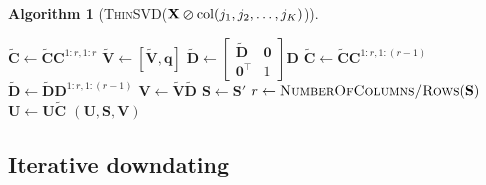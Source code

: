 \documentclass[11pt,a4paper]{article}
\theoremstyle{break}
\newtheorem*{algorithm}{Algorithm}
\numberwithin{dummy}{section}
\theoremstyle{plain}
\theoremstyle{plain}
\theoremstyle{plain}
\theoremstyle{plain}
\theoremstyle{plain}
\theoremstyle{MyNonumberplain}
\newcommand{\0}{\M{0}}
\newcommand{\M}[1]{\mathbf{#1}}
\newcommand{\Mt}[1]{\tilde{\M{#1}}}
\newcommand{\T}{\top}
\newcommand{\ve}[1]{\mathbf{#1}}
\newcommand{\delrow}[2]{\M{#1} \varominus \mathrm{row}(#2)}
\newcommand{\zercol}[2]{\M{#1} \varoslash \mathrm{col}(#2)}
\begin{document}
\begin{algorithm}[\textnormal{\textsc{ThinSVD}(\unboldmath$\zercol{X}{j_1,j_2, \dots, j_K}$)}]
\begin{algorithmic}[1]
    \If {$\ve{q} \neq \0$}
    \State
    \begin{math}
      \Mt{C}
      \gets
      \Mt{C}  \M{C}^{1:r, 1:r}
    \end{math}
    \State
    \begin{math}
      \Mt{V} \gets [\Mt{V}, \ve{q}]
    \end{math}
    \State
    \begin{math}
      \Mt{D}
      \gets
      \begin{bmatrix}
        \Mt{D} & \0
        \\
        \0^\T & 1
      \end{bmatrix}
      \M{D}
    \end{math}
    \Else
    \State
    \begin{math}
      \Mt{C}
      \gets
      \Mt{C}  \M{C}^{1:r, 1:(r-1)}
    \end{math}
    \State
    \begin{math}
      \Mt{D}
      \gets
      \Mt{D} \M{D}^{1:r, 1:(r-1)}
    \end{math}
    \EndIf
    \State
    \begin{math}
      \M{V} \gets \Mt{V} \Mt{D}
    \end{math}
    \State
    \begin{math}
      \M{S} \gets \M{S}'
    \end{math}
    \State
    \begin{math}
      r \gets \textsc{NumberOfColumns/Rows}(\M{S})
    \end{math}
    \EndFor
   \State
    \begin{math}
      \M{U} \gets \M{U} \Mt{C}
    \end{math}
    \State
    \Return $(\M{U}, \M{S}, \M{V})$
  \end{algorithmic}
\end{algorithm}



\subsection{Iterative downdating}
\label{sec:iterative-downdating}
\end{document}
